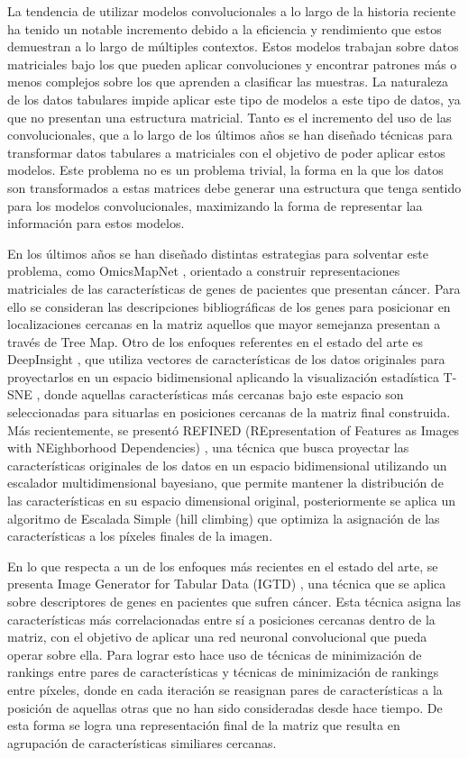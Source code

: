 \documentclass{uathesis-es}
\begin{document}
La tendencia de utilizar modelos convolucionales a lo largo de la historia reciente ha tenido un notable incremento debido a la eficiencia y rendimiento que estos demuestran a lo largo de múltiples contextos. Estos modelos trabajan sobre datos matriciales bajo los que pueden aplicar convoluciones y encontrar patrones más o menos complejos sobre los que aprenden a clasificar las muestras. La naturaleza de los datos tabulares impide aplicar este tipo de modelos a este tipo de datos, ya  que no presentan una estructura matricial. Tanto es el incremento del uso de las convolucionales, que a lo largo de los últimos años se han diseñado técnicas para transformar datos tabulares a matriciales con el objetivo de poder aplicar estos modelos. Este problema no es un problema trivial, la forma en la que los datos son transformados a estas matrices debe generar una estructura que tenga sentido para los modelos convolucionales, maximizando la forma de representar laa información para estos modelos. 

En los últimos años se han diseñado distintas estrategias para solventar este problema, como OmicsMapNet \cite{ma2019omicsmapnet}, orientado a construir representaciones matriciales de las características de genes de pacientes que presentan cáncer. Para ello se consideran las descripciones bibliográficas de los genes para posicionar en localizaciones cercanas en la matriz aquellos que mayor semejanza presentan a través de Tree Map. Otro de los enfoques referentes en el estado del arte es DeepInsight \cite{Sharma2019}, que utiliza vectores de características de los datos originales para proyectarlos en un espacio bidimensional aplicando la visualización estadística T-SNE \cite{van2008visualizing}, donde aquellas características más cercanas bajo este espacio son seleccionadas para situarlas en posiciones cercanas de la matriz final construida. Más recientemente, se presentó REFINED (REpresentation of Features as Images with NEighborhood Dependencies) \cite{Bazgir2020}, una técnica que busca proyectar las características originales de los datos en un espacio bidimensional utilizando un escalador multidimensional bayesiano, que permite mantener la distribución de las características en su espacio dimensional original, posteriormente se aplica un algoritmo de Escalada Simple (hill climbing) que optimiza la asignación de las características a los píxeles finales de la imagen.

En lo que respecta a un de los enfoques más recientes en el estado del arte, se presenta Image Generator for Tabular Data (IGTD) \cite{Zhu2021}, una técnica que se aplica sobre descriptores de genes en pacientes que sufren cáncer. Esta técnica asigna las características más correlacionadas entre sí a posiciones cercanas dentro de la matriz, con el objetivo de aplicar una red neuronal convolucional que pueda operar sobre ella. Para lograr esto hace uso de técnicas de minimización de rankings entre pares de características y técnicas de minimización de rankings entre píxeles, donde en cada iteración se reasignan pares de características a la posición de aquellas otras que no han sido consideradas desde hace tiempo. De esta forma se logra una representación final de la matriz que resulta en agrupación de características similiares cercanas.
\end{document}
